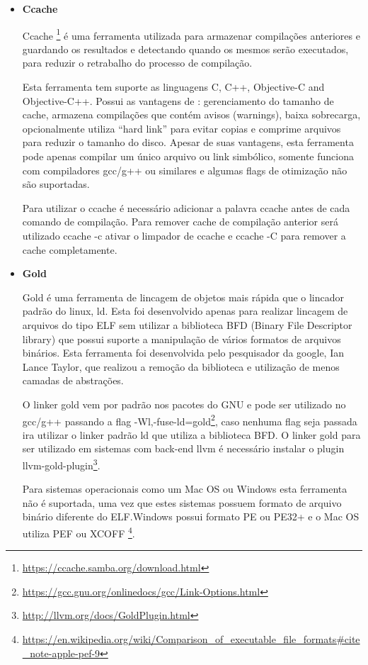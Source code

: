 \begin{itemize}
	\item \textbf{Ccache} \label{ccache}
	
	\subitem Ccache \footnote{\url{https://ccache.samba.org/download.html}} é uma ferramenta utilizada
 para armazenar compilações anteriores e 
guardando os resultados e detectando quando os mesmos serão executados,
 para reduzir o retrabalho do processo de compilação.

    \subitem Esta ferramenta tem suporte as linguagens C, C++, Objective-C and Objective-C++.
 Possui as vantagens de : gerenciamento do tamanho de cache,
 armazena compilações que contém avisos (warnings), baixa sobrecarga,
 opcionalmente utiliza “hard link” para evitar copias e comprime arquivos para
 reduzir o tamanho do disco. Apesar de suas vantagens, esta ferramenta pode apenas
 compilar um único arquivo ou link simbólico, somente funciona com compiladores gcc/g++
 ou similares e algumas flags de otimização não são suportadas.

	\subitem Para utilizar o ccache é necessário adicionar a palavra ccache antes de cada
 comando de compilação. Para remover cache de compilação anterior será utilizado
 ccache -c ativar o limpador de ccache e ccache -C para remover a cache completamente.

	\item \textbf{Gold} \label{Gold}

	\subitem Gold é uma ferramenta de lincagem de objetos mais rápida que o lincador padrão do linux,
 ld. Esta foi desenvolvido apenas para realizar lincagem de arquivos do tipo ELF sem utilizar
 a biblioteca BFD (Binary File Descriptor library) que possui suporte a manipulação de vários
 formatos de arquivos binários. Esta ferramenta foi desenvolvida pelo pesquisador da google,
 Ian Lance Taylor, que realizou a remoção da biblioteca e utilização de menos camadas de abstrações.

	\subitem O linker gold vem por padrão nos pacotes do GNU e pode ser utilizado no gcc/g++ passando a flag
 -Wl,-fuse-ld=gold\footnote{\url{https://gcc.gnu.org/onlinedocs/gcc/Link-Options.html}},
 caso nenhuma flag seja passada ira utilizar o linker padrão ld que utiliza
 a biblioteca BFD. O linker gold para ser utilizado em sistemas com back-end llvm é necessário
 instalar o plugin llvm-gold-plugin\footnote{\url{http://llvm.org/docs/GoldPlugin.html}}.

	\subitem Para sistemas operacionais como um Mac OS ou Windows esta ferramenta não é suportada, uma vez que
estes sistemas possuem formato de arquivo binário diferente do ELF.Windows possui formato PE ou PE32+ e 
o Mac OS utiliza PEF ou XCOFF
\footnote{\url{https://en.wikipedia.org/wiki/Comparison\_of\_executable\_file\_formats\#cite\_note-apple-pef-9}}.
\end{itemize}
